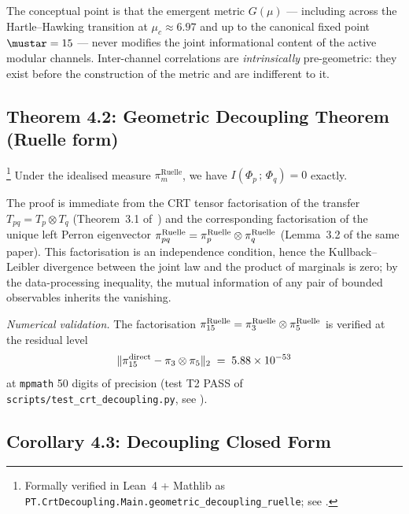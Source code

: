 The conceptual point is that the emergent metric $G(\mu)$ ---
including across the Hartle--Hawking transition at $\mu_c \approx
6.97$ and up to the canonical fixed point $\mustar = 15$ --- never
modifies the joint informational content of the active modular
channels. Inter-channel correlations are \emph{intrinsically}
pre-geometric: they exist before the construction of the metric
and are indifferent to it.

\subsection{Theorem 4.2: Geometric Decoupling Theorem (Ruelle form)}
\label{ssec:thm_4_2_en}

\begin{theorem}
\label{thm:ruelle_zero_en}
\footnote{Formally verified in Lean~4 + Mathlib as
\texttt{PT.CrtDecoupling.Main.geometric\_decoupling\_ruelle};
see \cite[\S~8.5]{PT_CRT_DECOUPLING}.}
Under the idealised measure $\pi_m^{\mathrm{Ruelle}}$, we have
$I(\Phi_p\,;\,\Phi_q) = 0$ exactly.
\end{theorem}

The proof is immediate from the CRT tensor factorisation of the
transfer $T_{pq} = T_p \otimes T_q$ (Theorem~3.1
of~\cite{PT_CRT_DECOUPLING}) and the corresponding factorisation
of the unique left Perron eigenvector
$\pi_{pq}^{\rm Ruelle} = \pi_p^{\rm Ruelle} \otimes \pi_q^{\rm Ruelle}$
(Lemma~3.2 of the same paper). This factorisation is an
independence condition, hence the Kullback--Leibler divergence
between the joint law and the product of marginals is zero; by
the data-processing inequality, the mutual information of any
pair of bounded observables inherits the vanishing.

\emph{Numerical validation.} The factorisation
$\pi_{15}^{\rm Ruelle} = \pi_3^{\rm Ruelle} \otimes \pi_5^{\rm Ruelle}$
is verified at the residual level
\begin{equation}
  \|\pi_{15}^{\rm direct} - \pi_3 \otimes \pi_5\|_2
  \;=\; 5.88 \times 10^{-53}
\end{equation}
at \texttt{mpmath} 50 digits of precision (test T2 PASS of
\texttt{scripts/test\_crt\_decoupling.py}, see
\cite{PT_CRT_DECOUPLING}).

\subsection{Corollary 4.3: Decoupling Closed Form}
\label{ssec:cor_4_3_en}

